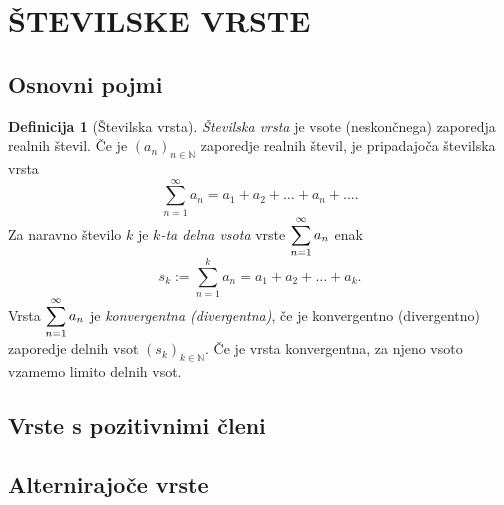 \documentclass[11pt]{article}
\theoremstyle{definition}
\newtheorem{definicija}{Definicija}[section]
\theoremstyle{definition}
\theoremstyle{definition}
\theoremstyle{theorem}
\begin{document}
\pagebreak


\section{ŠTEVILSKE VRSTE}
\vspace{0.5cm}


\subsection{Osnovni pojmi}
\vspace{0.5cm}

\begin{definicija}[Številska vrsta]

\textit{Številska vrsta} je vsote (neskončnega) zaporedja realnih števil. Če je $(a_n)_{n \in \mathbb{N}}$ zaporedje realnih števil, je pripadajoča številska vrsta
$$\sum_{n=1}^{\infty} a_n = a_1 + a_2 + \ldots + a_n + \ldots .$$
Za naravno število $k$ je \textit{$k$-ta delna vsota} vrste $\mathlarger{\sum_{n=1}^{\infty} a_n}$ enak
$$s_k := \sum_{n=1}^{k} a_n = a_1 + a_2 + \ldots + a_k.$$
Vrsta $\mathlarger{\sum_{n=1}^{\infty} a_n}$ je \textit{konvergentna (divergentna)}, če je konvergentno (divergentno) zaporedje delnih vsot $(s_k)_{k \in \mathbb{N}}$. Če je vrsta konvergentna, za njeno vsoto vzamemo limito delnih vsot.

\end{definicija}
\vspace{0.5cm}


\subsection{Vrste s pozitivnimi členi}
\vspace{0.5cm}


\subsection{Alternirajoče vrste}
\vspace{0.5cm}
\end{document}
